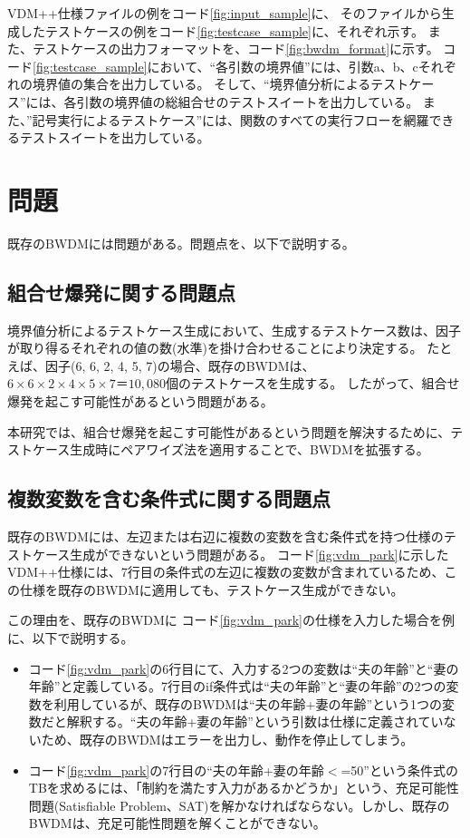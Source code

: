\documentclass[uplatex, report, a4j, 10pt]{jsbook}
\begin{document}
VDM++仕様ファイルの例をコード\ref{fig:input_sample}に、
そのファイルから生成したテストケースの例をコード\ref{fig:testcase_sample}に、それぞれ示す。
また、テストケースの出力フォーマットを、コード\ref{fig:bwdm_format}に示す。
コード\ref{fig:testcase_sample}において、“各引数の境界値”には、引数a、b、cそれぞれの境界値の集合を出力している。
そして、“境界値分析によるテストケース”には、各引数の境界値の総組合せのテストスイートを出力している。
また、”記号実行によるテストケース”には、関数のすべての実行フローを網羅できるテストスイートを出力している。

\section{問題}\label{sec:bwdm_problem}
既存のBWDMには問題がある。問題点を、以下で説明する。

\subsection{組合せ爆発に関する問題点}\label{sec:problem_pairwise}
境界値分析によるテストケース生成において、生成するテストケース数は、因子が取り得るそれぞれの値の数(水準)を掛け合わせることにより決定する。
たとえば、因子(6, 6, 2, 4, 5, 7)の場合、既存のBWDMは、$6 \times 6 \times 2 \times 4 \times 5 \times 7＝10,080個$のテストケースを生成する。
したがって、組合せ爆発を起こす可能性があるという問題がある。

本研究では、組合せ爆発を起こす可能性があるという問題を解決するために、テストケース生成時にペアワイズ法を適用することで、BWDMを拡張する。

\subsection{複数変数を含む条件式に関する問題点}\label{sec:problem_double_var}

既存のBWDMには、左辺または右辺に複数の変数を含む条件式を持つ仕様のテストケース生成ができないという問題がある。
コード\ref{fig:vdm_park}に示したVDM++仕様には、7行目の条件式の左辺に複数の変数が含まれているため、この仕様を既存のBWDMに適用しても、テストケース生成ができない。

この理由を、既存のBWDMに コード\ref{fig:vdm_park}の仕様を入力した場合を例に、以下で説明する。

\begin{itemize}
  \item  コード\ref{fig:vdm_park}の6行目にて、入力する2つの変数は“夫の年齢”と“妻の年齢”と定義している。7行目のif条件式は“夫の年齢”と“妻の年齢”の2つの変数を利用しているが、既存のBWDMは“夫の年齢+妻の年齢”という1つの変数だと解釈する。“夫の年齢+妻の年齢”という引数は仕様に定義されていないため、既存のBWDMはエラーを出力し、動作を停止してしまう。
  \item  コード\ref{fig:vdm_park}の7行目の“夫の年齢+妻の年齢$<$=50”という条件式のTBを求めるには、「制約を満たす入力があるかどうか」という、充足可能性問題(Satisfiable Problem、SAT)\cite{sat}を解かなければならない。しかし、既存のBWDMは、充足可能性問題を解くことができない。
\end{itemize}
\end{document}
